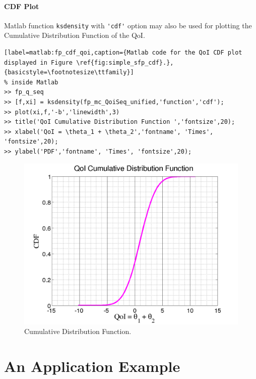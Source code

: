 \subsubsection{CDF Plot}

Matlab function \verb+ksdensity+ with \verb+'cdf'+ option may also be used for plotting the Cumulative Distribution Function of the QoI.

\begin{lstlisting}[label=matlab:fp_cdf_qoi,caption={Matlab code for the QoI CDF plot displayed in Figure \ref{fig:simple_sfp_cdf}.},{basicstyle=\footnotesize\ttfamily}]
% inside Matlab
>> fp_q_seq
>> [f,xi] = ksdensity(fp_mc_QoiSeq_unified,'function','cdf');
>> plot(xi,f,'-b','linewidth',3)
>> title('QoI Cumulative Distribution Function ','fontsize',20);
>> xlabel('QoI = \theta_1 + \theta_2','fontname', 'Times', 'fontsize',20);
>> ylabel('PDF','fontname', 'Times', 'fontsize',20);
\end{lstlisting}

\begin{figure}[htb]
\centering 
\includegraphics[scale=0.35]{rawfigs/simple_fp_qoi_cdf.png}
\vspace*{-10pt}
\caption{Cumulative Distribution Function.}
\label{fig:simple_sfp_cdf}
\end{figure}


\chapter{An Application Example}\label{ch-appl-example}
\thispagestyle{headings}

